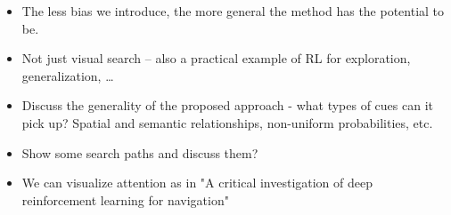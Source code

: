 \begin{itemize}
    \item The less bias we introduce, the more general the method has the potential to be.
    \item Not just visual search -- also a practical example of RL for exploration, generalization, \dots
    \item Discuss the generality of the proposed approach - what types of cues can it pick up? Spatial and semantic relationships, non-uniform probabilities, etc. 
    \item Show some search paths and discuss them?
    \item We can visualize attention as in "A critical investigation of deep reinforcement learning for navigation"
\end{itemize}

